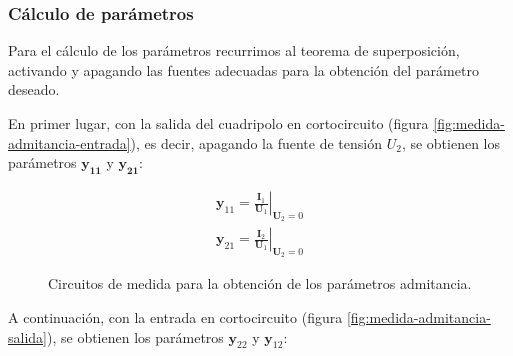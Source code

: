 \subsubsection{Cálculo de parámetros}

Para el cálculo de los parámetros recurrimos al teorema de superposición, activando y apagando las fuentes adecuadas para la obtención del parámetro deseado.

En primer lugar, con la salida del cuadripolo en cortocircuito (figura \ref{fig:medida-admitancia-entrada}), es decir, apagando la fuente de tensión $U_2$, se obtienen los parámetros $\mathbf{y_{11}}$ y $\mathbf{y_{21}}$:

\[
  \begin{array}{c}
    \mathbf{y}_{11} = \left.\frac{\mathbf{I}_1}{\mathbf{U}_1}\right\rvert_{\mathbf{U}_2 = 0} \\
    \mathbf{y}_{21} = \left.\frac{\mathbf{I}_2}{\mathbf{U}_1}\right\rvert_{\mathbf{U}_2 = 0}
  \end{array}
\]

\begin{figure}[H]
  \centering
  \hspace{2cm}
\caption{Circuitos de medida para la obtención de los parámetros admitancia.}
  \label{fig:medida-admitancia}
\end{figure}

A continuación, con la entrada en cortocircuito (figura \ref{fig:medida-admitancia-salida}), se obtienen los parámetros $\mathbf{y}_{22}$ y $\mathbf{y}_{12}$:

